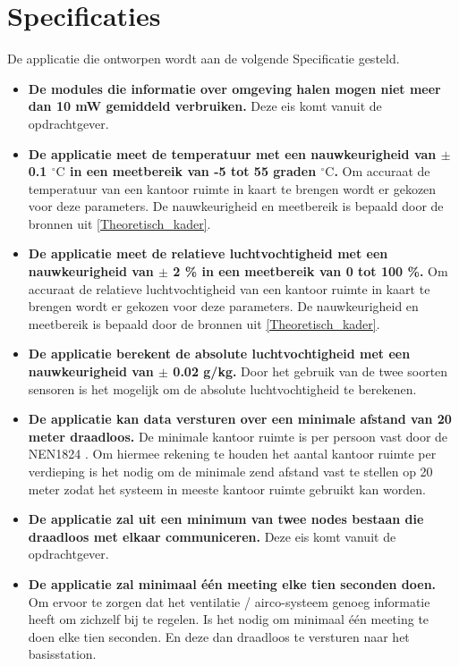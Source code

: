 \newpage
\section{Specificaties}
De applicatie die ontworpen wordt aan de volgende Specificatie gesteld.
\begin{itemize}
    \item \textbf{De modules die informatie over omgeving halen mogen niet meer dan 10 mW gemiddeld verbruiken.} Deze eis komt vanuit de opdrachtgever.
    \item \textbf{De applicatie meet de temperatuur met een nauwkeurigheid van $\pm$ 0.1 $^\circ\text{C}$ in een meetbereik van -5 tot 55 graden $^\circ\text{C}$.} Om accuraat de temperatuur van een kantoor ruimte in kaart te brengen wordt er gekozen voor deze parameters. De nauwkeurigheid en meetbereik is bepaald door de bronnen uit \ref{Theoretisch_kader}.
    \item \textbf{De applicatie meet de relatieve luchtvochtigheid met een nauwkeurigheid van $\pm$ 2 \% in een meetbereik van 0 tot 100 \%.} Om accuraat de relatieve luchtvochtigheid van een kantoor ruimte in kaart te brengen wordt er gekozen voor deze parameters. De nauwkeurigheid en meetbereik is bepaald door de bronnen uit \ref{Theoretisch_kader}.
    \item \textbf{De applicatie berekent de absolute luchtvochtigheid met een nauwkeurigheid van $\pm$ 0.02 g/kg.} Door het gebruik van de twee soorten sensoren is het mogelijk om de absolute luchtvochtigheid te berekenen.
    \item \textbf{De applicatie kan data versturen over een minimale afstand van 20 meter draadloos.} De minimale kantoor ruimte is per persoon vast door de NEN1824 \cite{NEN1824}. Om hiermee rekening te houden het aantal kantoor ruimte per verdieping is het nodig om de minimale zend afstand vast te stellen op 20 meter zodat het systeem in meeste kantoor ruimte gebruikt kan worden.
    \item \textbf{De applicatie zal uit een minimum van twee nodes bestaan die draadloos met elkaar communiceren.} Deze eis komt vanuit de opdrachtgever.
    \item \textbf{De applicatie zal minimaal één meeting elke tien seconden doen.} Om ervoor te zorgen dat het ventilatie / airco-systeem genoeg informatie heeft om zichzelf bij te regelen. Is het nodig om minimaal één meeting te doen elke tien seconden. En deze dan draadloos te versturen naar het basisstation.
\end{itemize}
